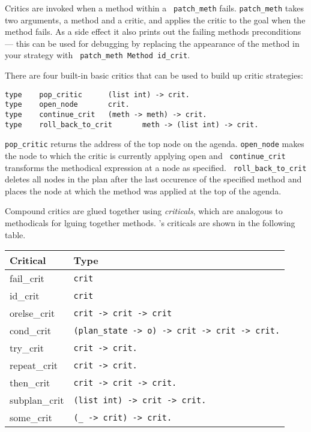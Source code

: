 Critics are invoked when a method within a {\tt
  patch\_meth} fails.  {\tt patch\_meth} takes two
arguments, a method and a critic, and applies the critic to the goal
when the method fails.  As a side effect it also prints out the
failing methods preconditions --- this can be used for debugging by
replacing the appearance of the method in your strategy with {\tt
  patch\_meth Method id\_crit}.

There are four built-in basic critics that can
be used to build up critic strategies:

\begin{verbatim}
type    pop_critic      (list int) -> crit.
type    open_node       crit.
type    continue_crit   (meth -> meth) -> crit.
type    roll_back_to_crit       meth -> (list int) -> crit.
\end{verbatim}

{\tt pop\_critic} returns the address of the top
node on the agenda.  {\tt open\_node}
makes the node to which the critic is currently applying open and {\tt
  continue\_crit} transforms the methodical
expression at a node as specified.  {\tt
  roll\_back\_to\_crit} deletes all nodes
in the plan after the last occurence of the specified method and
places the node at which the method was applied at the top of the
agenda.

Compound critics are glued together using {\em
  criticals}, which are analogous to methodicals for
lguing together methods.  \lclam's criticals are shown in the
following table.
\begin{center}
\begin{tabular}{|l|l|} \hline
Critical & Type \\ \hline
fail\_crit\index{fail\_crit} & {\tt crit} \\
id\_crit\index{id\_crit} & {\tt crit} \\
orelse\_crit\index{orelse\_crit} & {\tt crit -> crit -> crit} \\
cond\_crit\index{cond\_crit} & {\tt    (plan\_state -> o) -> crit -> crit -> crit.} \\
try\_crit\index{try\_crit} & {\tt         crit -> crit.} \\
repeat\_crit\index{repeat\_crit} & {\tt      crit -> crit.} \\
then\_crit\index{then\_crit} & {\tt        crit -> crit -> crit.} \\
subplan\_crit\index{subplan\_crit} & {\tt     (list int) -> crit -> crit.} \\
some\_crit\index{some\_crit} & {\tt        (\_ -> crit) -> crit.} \\ \hline
\end{tabular}
\end{center}

